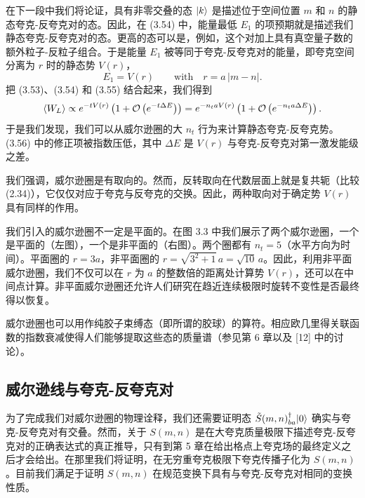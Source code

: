 在下一段中我们将论证，具有非零交叠的态 $|k\rangle$ 是描述位于空间位置 $m$ 和 $n$ 的静态夸克-反夸克对的态。因此，在 (3.54) 中，能量最低 $E_1$ 的项预期就是描述我们静态夸克-反夸克对的态。更高的态可以是，例如，这个对加上具有真空量子数的额外粒子-反粒子组合。于是能量 $E_1$ 被等同于夸克-反夸克对的能量，即夸克空间分离为 $r$ 时的静态势 $V(r)$，
\begin{equation}
  E_1 = V(r) \qquad \text{with} \quad r = a\,|m - n| .
\end{equation}
把 (3.53)、(3.54) 和 (3.55) 结合起来，我们得到
\begin{equation}
  \left\langle W_L \right\rangle \propto e^{-tV(r)}\left(1 + \mathcal{O}\left(e^{-t\Delta E}\right)\right)
  = e^{-n_t a V(r)}\left(1 + \mathcal{O}\left(e^{-n_t a \Delta E}\right)\right) .
\end{equation}
于是我们发现，我们可以从威尔逊圈的大 $n_t$ 行为来计算静态夸克-反夸克势。(3.56) 中的修正项被指数压低，其中 $\Delta E$ 是 $V(r)$ 与夸克-反夸克对第一激发能级之差。

我们强调，威尔逊圈是有取向的。然而，反转取向在代数层面上就是复共轭（比较 (2.34)），它仅仅对应于夸克与反夸克的交换。因此，两种取向对于确定势 $V(r)$ 具有同样的作用。

我们引入的威尔逊圈不一定是平面的。在图 3.3 中我们展示了两个威尔逊圈，一个是平面的（左图），一个是非平面的（右图）。两个圈都有 $n_t = 5$（水平方向为时间）。平面圈的 $r = 3a$，非平面圈的 $r = \sqrt{3^2 + 1}\,a = \sqrt{10}\,a$。因此，利用非平面威尔逊圈，我们不仅可以在 $r$ 为 $a$ 的整数倍的距离处计算势 $V(r)$，还可以在中间点计算。非平面威尔逊圈还允许人们研究在趋近连续极限时旋转不变性是否最终得以恢复。

威尔逊圈也可以用作纯胶子束缚态（即所谓的胶球）的算符。相应欧几里得关联函数的指数衰减使得人们能够提取这些态的质量谱（参见第 6 章以及 [12] 中的讨论）。

\subsection{威尔逊线与夸克-反夸克对}

为了完成我们对威尔逊圈的物理诠释，我们还需要证明态 $\tilde S(m,n)^\dagger_{ba}|0\rangle$ 确实与夸克-反夸克对有交叠。然而，关于 $S(m, n)$ 是在大夸克质量极限下描述夸克-反夸克对的正确表达式的真正推导，只有到第 5 章在给出格点上夸克场的最终定义之后才会给出。在那里我们将证明，在无穷重夸克极限下夸克传播子化为 $S(m, n)$。目前我们满足于证明 $S(m, n)$ 在规范变换下具有与夸克-反夸克对相同的变换性质。

